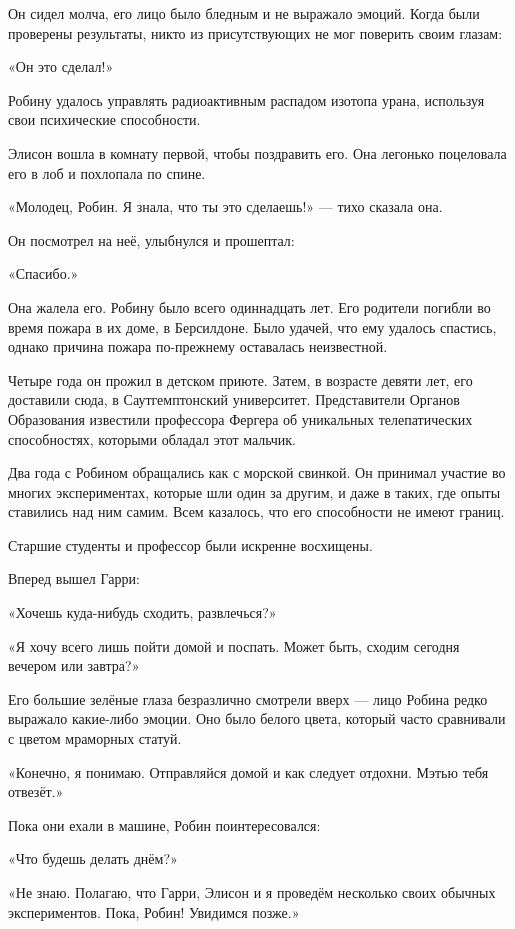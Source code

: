 \documentclass[a5paper, 9pt,
final, openany, twoside=true]{memoir}
\begin{document}
Он сидел молча, его лицо было бледным и не выражало эмоций. Когда были проверены результаты, никто из присутствующих не мог поверить своим глазам:\bigskip

«Он это сделал!»\bigskip

Робину удалось управлять радиоактивным распадом изотопа урана, используя свои психические способности.

Элисон вошла в комнату первой, чтобы поздравить его. Она легонько поцеловала его в лоб и похлопала по спине.

«Молодец, Робин. Я знала, что ты это сделаешь!» — тихо сказала она.\bigskip

Он посмотрел на неё, улыбнулся и прошептал:

«Спасибо.»

Она жалела его. Робину было всего одиннадцать лет. Его родители погибли во время пожара в их доме, в Берсилдоне. Было удачей, что ему удалось спастись, однако причина пожара по-прежнему оставалась неизвестной.

Четыре года он прожил в детском приюте. Затем, в возрасте девяти лет, его доставили сюда, в Саутгемптонский университет. Представители Органов Образования известили профессора Фергера об уникальных телепатических способностях, которыми обладал этот мальчик.

Два года с Робином обращались как с морской свинкой. Он принимал участие во многих экспериментах, которые шли один за другим, и даже в таких, где опыты ставились над ним самим. Всем казалось, что его способности не имеют границ.\bigskip

Старшие студенты и профессор были искренне восхищены.

Вперед вышел Гарри:

«Хочешь куда-нибудь сходить, развлечься?»

«Я хочу всего лишь пойти домой и поспать. Может быть, сходим сегодня вечером или завтра?»

Его большие зелёные глаза безразлично смотрели вверх — лицо Робина редко выражало какие-либо эмоции. Оно было белого цвета, который часто сравнивали с цветом мраморных статуй.

«Конечно, я понимаю. Отправляйся домой и как следует отдохни. Мэтью тебя отвезёт.»\bigskip

Пока они ехали в машине, Робин поинтересовался:

«Что будешь делать днём?»

«Не знаю. Полагаю, что Гарри, Элисон и я проведём несколько своих обычных экспериментов. Пока, Робин! Увидимся позже.»
\end{document}
